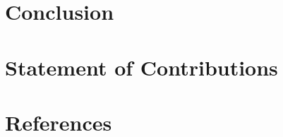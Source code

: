 \documentclass[conference]{IEEEtran}
\begin{document}
\section{Conclusion}

\section{Statement of Contributions}

\section{References}
\end{document}
